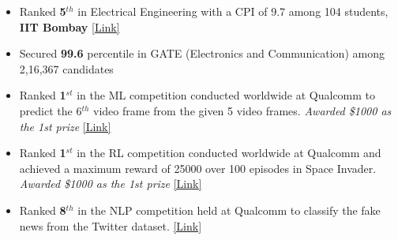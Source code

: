 \documentclass{article}
\begin{document}
\begin{itemize}
\setlength{\itemsep}{-0.10em}

\item Ranked \textbf{5$^{th}$}  in Electrical Engineering with a CPI of 9.7 among 104 students, \textbf{IIT Bombay}   
\hfill{\href{https://drive.google.com/file/d/1U6Im2h50TI0gOA6D1DFieJkynd2bFfO8/view?usp=sharing}{[Link]}}

 

\item Secured \textbf{99.6} percentile in GATE (Electronics and Communication) among 2,16,367 candidates


\item Ranked \textbf{1$^{st}$} in the ML competition conducted  worldwide at Qualcomm to predict the {6$^{th}$} video frame from the given 5 video frames. \textit{Awarded \$1000 as the 1st prize} 
\hfill{\href{https://drive.google.com/file/d/1uwSr-1dlImn5JYRzPpn62ublzCWKSGr0/view?usp=sharing}{[Link]}}



\item Ranked \textbf{1$^{st}$} in the RL competition conducted worldwide at Qualcomm  and achieved a maximum reward of 25000 over 100 episodes in Space Invader.  \textit{Awarded \$1000 as the 1st prize} 
\hfill{\href{https://drive.google.com/file/d/13voQkZ9kiybTD-pCkeTBRxmi9IeBtqnG/view?usp=sharing}{[Link]}}





\item Ranked \textbf{8$^{th}$} in the NLP competition held at Qualcomm to classify the fake news from the Twitter dataset.
\hfill{\href{https://drive.google.com/file/d/1mOlilPLZSuHSyqRIVukRvXs_700Hmz5I/view?usp=sharing}{[Link]}}




\end{itemize}
\vspace{-2mm}


\end{document}
